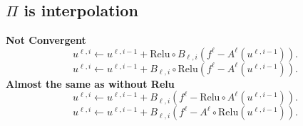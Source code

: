 \subsection{$\Pi$ is interpolation}
\textbf{Not Convergent}
		\begin{equation}
		u^{\ell,i} \leftarrow u^{\ell,i-1} + \text{Relu}\circ B_{\ell,i}  ({f^\ell -  A^{\ell} (u^{\ell,i-1})}).
		\end{equation}
	 \begin{equation}
	 u^{\ell,i} \leftarrow u^{\ell,i-1} + B_{\ell,i}\circ\text{Relu}({f^\ell -  A^{\ell} (u^{\ell,i-1})}).
	 \end{equation}
\textbf{Almost the same as without Relu}
	 \begin{equation}
	 u^{\ell,i} \leftarrow u^{\ell,i-1} +B_{\ell,i}  ({f^\ell -   \text{Relu}\circ A^{\ell} (u^{\ell,i-1})}).
	 \end{equation}
	 \begin{equation}
	 u^{\ell,i} \leftarrow u^{\ell,i-1} + B_{\ell,i}  ({f^\ell -  A^{\ell} \circ\text{Relu}(u^{\ell,i-1})}).
	 \end{equation}
